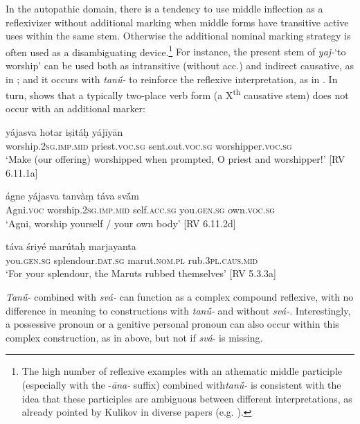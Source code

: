 \documentclass[output=paper]{langscibook}
\begin{document}
In the {autopathic} {domain,} there is a tendency to use middle inflection as a reflexivizer without additional marking when middle forms have transitive active uses within the same stem. Otherwise the additional nominal marking strategy is often used as a disambiguating device.\footnote{{{The high number of reflexive examples with an athematic middle participle (especially with the -}{\textit{āna-} }{suffix) combined with}{\textit{tan\'{ū}-} }{is consistent with the idea that these participles are ambiguous between different interpretations, as already pointed by Kulikov in diverse papers (e.g. \citealt{Kulikov2006}).}}}{ For instance, the present stem of \textit{yaj-}‘to worship’ can be used both as intransitive (without acc.) and indirect causative, as in ; and it occurs with \textit{tan\'{ū}-} to reinforce the reflexive interpretation, as in . In turn,  shows that a typically two-place verb form (a X\textsuperscript{th} causative stem) does not occur with an additional marker:}

\ea%
    \label{ex:Orqueda:16}
    \ea
     \label{ex:Orqueda:16a}
\gll yájasva   hotar   iṣitáḥ   yájīyān\\
      worship.\textsc{2sg.imp.mid}   priest\textsc{.voc.sg}  sent.out.\textsc{voc.sg}   worshipper.\textsc{voc.sg}\\
\glt ‘Make (our offering) worshipped when prompted, O priest and worshipper!’ [RV 6.11.1a]

\ex
 \label{ex:Orqueda:16b}
\gll ágne   yájasva  tanvàṃ  táva   sv\'{ā}m\\
      Agni.\textsc{voc}  worship.\textsc{2sg.imp.mid}  self.\textsc{acc.sg}  you.\textsc{gen.sg}   own.\textsc{voc.sg}\\
\glt ‘Agni, worship yourself / your own body’ [RV 6.11.2d]
\z
\z

\ea%
    \label{ex:Orqueda:17}
\gll táva   śriyé   marútaḥ   marjayanta\\
      you.\textsc{gen.sg}   splendour.\textsc{dat.sg}   marut.\textsc{nom.pl}   rub.3\textsc{pl.caus.mid}\\
\glt ‘For your splendour, the Maruts rubbed themselves’ [RV 5.3.3a]
\z

{\textit{Tan\'{ū}-} combined with \textit{svá-} can function as a complex compound reflexive, with no difference in meaning to constructions with \textit{tan\'{ū}-} and without \textit{svá-}. Interestingly, a possessive pronoun or a genitive personal pronoun can also occur within this complex construction, as in  above, but not if \textit{svá}{}- is missing.}
\end{document}
